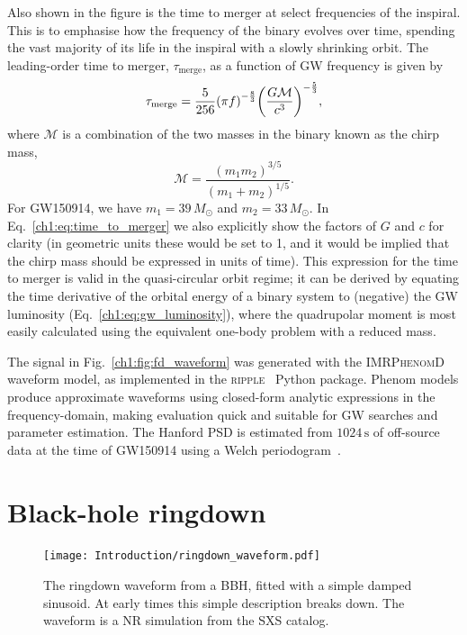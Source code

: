 Also shown in the figure is the time to merger at select frequencies of the inspiral.
This is to emphasise how the frequency of the binary evolves over time, spending the vast majority of its life in the inspiral with a slowly shrinking orbit.
The leading-order time to merger, $\tau_\mathrm{merge}$, as a function of GW frequency is given by
\begin{equation}\label{ch1:eq:time_to_merger}
    \tau_\mathrm{merge} = \frac{5}{256} \qty(\pi f)^{-\frac{8}{3}} \qty(\frac{G\mathcal{M}}{c^3})^{-\frac{5}{3}},
\end{equation}
where $\mathcal{M}$ is a combination of the two masses in the binary known as the chirp mass,
\begin{equation}
    \mathcal{M} = \frac{(m_1 m_2)^{3/5}}{(m_1 + m_2)^{1/5}}.
\end{equation}
For GW150914, we have $m_1 = 39\,M_\odot$ and $m_2 = 33\,M_\odot$.
In Eq.~\ref{ch1:eq:time_to_merger} we also explicitly show the factors of $G$ and $c$ for clarity (in geometric units these would be set to 1, and it would be implied that the chirp mass should be expressed in units of time). 
This expression for the time to merger is valid in the quasi-circular orbit regime; it can be derived by equating the time derivative of the orbital energy of a binary system to (negative) the GW luminosity (Eq.~\ref{ch1:eq:gw_luminosity}), where the quadrupolar moment is most easily calculated using the equivalent one-body problem with a reduced mass.

The signal in Fig.~\ref{ch1:fig:fd_waveform} was generated with the \textsc{IMRPhenomD}~\cite{Khan:2015jqa} waveform model, as implemented in the \textsc{ripple}~\cite{Edwards:2023sak} Python package.
Phenom models produce approximate waveforms using closed-form analytic expressions in the frequency-domain, making evaluation quick and suitable for GW searches and parameter estimation.
The Hanford PSD is estimated from $1024\,\mathrm{s}$ of off-source data at the time of GW150914 using a Welch periodogram~\cite{1161901}.


\section{Black-hole ringdown}
\label{ch1:sec:bh_ringdown}

\begin{figure}[t!]
    \centering
    \texttt{[image: Introduction/ringdown\_waveform.pdf]}
    \caption[Gravitational-wave ringdown waveform]{ 
    The ringdown waveform from a BBH, fitted with a simple damped sinusoid. 
    At early times this simple description breaks down. 
    The waveform is a NR simulation from the SXS catalog.
    }
    \label{ch1:fig:rd_waveform}
\end{figure}

